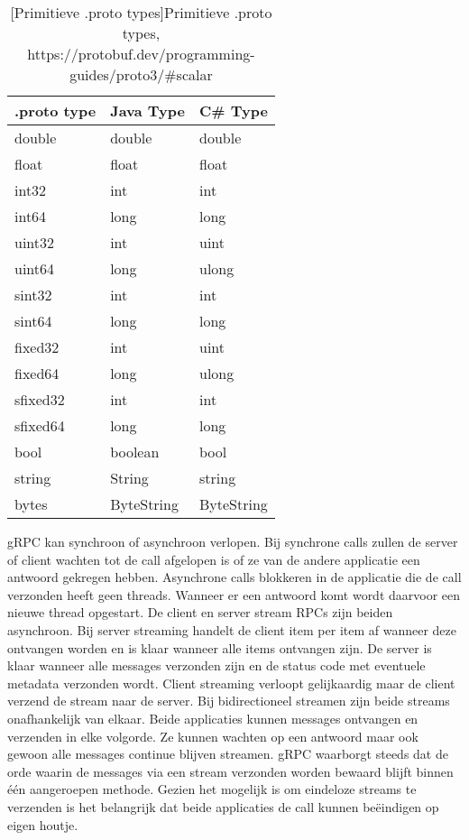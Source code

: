\begin{table}
    \centering
    \begin{tabular}{lll}
        \toprule
        \textbf{.proto type} & \textbf{Java Type} & \textbf{C\# Type} \\
        \midrule
        double & double & double \\
        float & float & float \\
        int32 & int & int \\
        int64 & long & long \\
        uint32 & int & uint \\
        uint64 & long & ulong \\
        sint32 & int & int \\
        sint64 & long & long \\
        fixed32 & int & uint \\
        fixed64 & long & ulong \\
        sfixed32 & int & int \\
        sfixed64 & long & long \\
        bool & boolean & bool \\
        string & String & string \\
        bytes & ByteString & ByteString \\
        \bottomrule
    \end{tabular}
    \caption{[Primitieve .proto types]Primitieve .proto types,\newline
    https://protobuf.dev/programming-guides/proto3/\#scalar}
    \label{tab:Types}
\end{table}

gRPC kan synchroon of asynchroon verlopen. Bij synchrone calls zullen de server of client wachten tot de call afgelopen is of ze van de andere applicatie een antwoord gekregen hebben.
Asynchrone calls blokkeren in de applicatie die de call verzonden heeft geen threads. Wanneer er een antwoord komt wordt daarvoor een nieuwe thread opgestart.
De client en server stream RPCs zijn beiden asynchroon. Bij server streaming handelt de client item per item af wanneer deze ontvangen worden en is klaar wanneer alle items ontvangen zijn.
De server is klaar wanneer alle messages verzonden zijn en de status code met eventuele metadata verzonden wordt.
Client streaming verloopt gelijkaardig maar de client verzend de stream naar de server.
Bij bidirectioneel streamen zijn beide streams onafhankelijk van elkaar. Beide applicaties kunnen messages ontvangen en verzenden in elke volgorde.
Ze kunnen wachten op een antwoord maar ook gewoon alle messages continue blijven streamen.
gRPC waarborgt steeds dat de orde waarin de messages via een stream verzonden worden bewaard blijft binnen één aangeroepen methode.
Gezien het mogelijk is om eindeloze streams te verzenden is het belangrijk dat beide applicaties de call kunnen be\"eindigen op eigen houtje.\newline
~\autocite{grpccoreconcepts}\\

